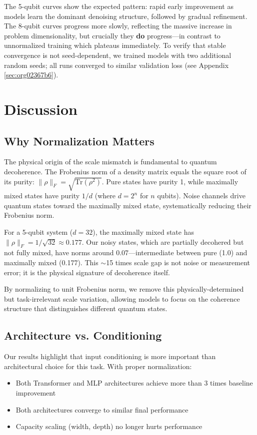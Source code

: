 \documentclass[11pt]{article}
\begin{document}
The 5-qubit curves show the expected pattern: rapid early improvement as models learn the dominant denoising structure, followed by gradual refinement. The 8-qubit curves progress more slowly, reflecting the massive increase in problem dimensionality, but crucially they \textbf{do} progress---in contrast to unnormalized training which plateaus immediately. To verify that stable convergence is not seed-dependent, we trained models with two additional random seeds; all runs converged to similar validation loss (see Appendix \ref{sec:org02367b6}).
\section{Discussion}
\label{sec:org947c244}

\subsection{Why Normalization Matters}
\label{sec:orgd9f7906}

The physical origin of the scale mismatch is fundamental to quantum decoherence. The Frobenius norm of a density matrix equals the square root of its purity: \(\|\rho\|_F = \sqrt{\mathrm{Tr}(\rho^2)}\). Pure states have purity 1, while maximally mixed states have purity \(1/d\) (where \(d = 2^n\) for \(n\) qubits). Noise channels drive quantum states toward the maximally mixed state, systematically reducing their Frobenius norm.

For a 5-qubit system (\(d = 32\)), the maximally mixed state has \(\|\rho\|_F = 1/\sqrt{32} \approx 0.177\). Our noisy states, which are partially decohered but not fully mixed, have norms around 0.07---intermediate between pure (1.0) and maximally mixed (0.177). This \(\sim\)15 times scale gap is not noise or measurement error; it is the physical signature of decoherence itself.

By normalizing to unit Frobenius norm, we remove this physically-determined but task-irrelevant scale variation, allowing models to focus on the coherence structure that distinguishes different quantum states.
\subsection{Architecture vs. Conditioning}
\label{sec:org4251947}

Our results highlight that input conditioning is more important than architectural choice for this task. With proper normalization:
\begin{itemize}
\item Both Transformer and MLP architectures achieve more than 3 times baseline improvement
\item Both architectures converge to similar final performance
\item Capacity scaling (width, depth) no longer hurts performance
\end{itemize}
\end{document}
